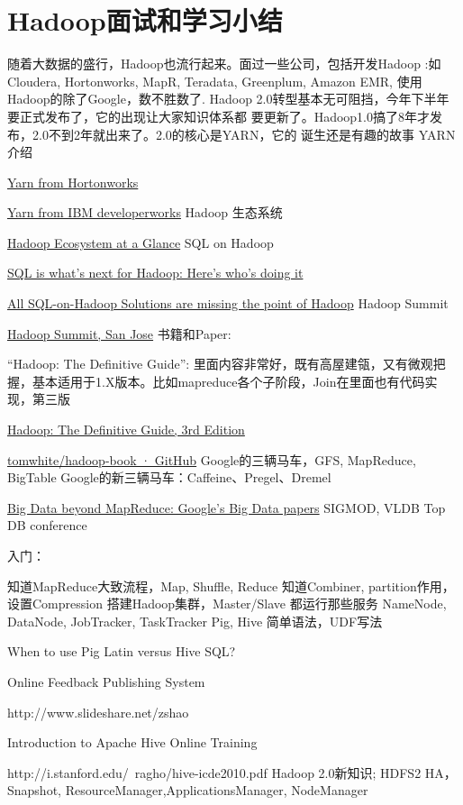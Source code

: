 \section{Hadoop面试和学习小结}
随着大数据的盛行，Hadoop也流行起来。面过一些公司，包括开发Hadoop :如Cloudera, Hortonworks, MapR, Teradata, Greenplum, Amazon EMR, 使用Hadoop的除了Google，数不胜数了.
Hadoop 2.0转型基本无可阻挡，今年下半年要正式发布了，它的出现让大家知识体系都 要更新了。Hadoop1.0搞了8年才发布，2.0不到2年就出来了。2.0的核心是YARN，它的 诞生还是有趣的故事
YARN介绍
\begindot
\item \href{http://hortonworks.com/hadoop/yarn/}{Yarn from Hortonworks} 
\item \href{http://www.ibm.com/developerworks/cn/opensource/os-cn-hadoop-yarn/}{Yarn from IBM developerworks}
\myenddot
Hadoop 生态系统
\begindot
\item \href{http://www.neevtech.com/blog/2013/03/18/hadoop-ecosystem-at-a-glance/}{Hadoop Ecosystem at a Glance}
\myenddot
SQL on Hadoop
\begindot
\item \href{http://gigaom.com/2013/02/21/sql-is-whats-next-for-hadoop-heres-whos-doing-it/}{SQL is what’s next for Hadoop: Here’s who’s doing it}
\item \href{http://hadapt.com/blog/2013/10/28/all-sql-on-hadoop-solutions-are-missing-the-point-of-hadoop/}{All SQL-on-Hadoop Solutions are missing the point of Hadoop}
\myenddot
Hadoop Summit
\begindot
\item \href{http://hadoopsummit.org/san-jose/}{Hadoop Summit, San Jose}
\myenddot
书籍和Paper:
\begindot
\item “Hadoop: The Definitive Guide”: 里面内容非常好，既有高屋建瓴，又有微观把握，基本适用于1.X版本。比如mapreduce各个子阶段，Join在里面也有代码实现，第三版
\item \href{http://it-ebooks.info/book/635/}{Hadoop: The Definitive Guide, 3rd Edition}
\item \href{https://github.com/tomwhite/hadoop-book}{tomwhite/hadoop-book · GitHub}
\myenddot
Google的三辆马车，GFS, MapReduce, BigTable Google的新三辆马车：Caffeine、Pregel、Dremel
\begindot
\item \href{http://blog.mikiobraun.de/2013/02/big-data-beyond-map-reduce-googles-papers.html}{Big Data beyond MapReduce: Google’s Big Data papers}
\myenddot
SIGMOD, VLDB Top DB conference

入门：

知道MapReduce大致流程，Map, Shuffle, Reduce
知道Combiner, partition作用，设置Compression
搭建Hadoop集群，Master/Slave 都运行那些服务 NameNode, DataNode, JobTracker, TaskTracker
Pig, Hive 简单语法，UDF写法
\begindot
\item When to use Pig Latin versus Hive SQL?
\item Online Feedback Publishing System
\item http://www.slideshare.net/zshao
\item Introduction to Apache Hive Online Training
\item http://i.stanford.edu/~ragho/hive-icde2010.pdf
\myenddot
Hadoop 2.0新知识; HDFS2 HA，Snapshot, ResourceManager,ApplicationsManager, NodeManager


